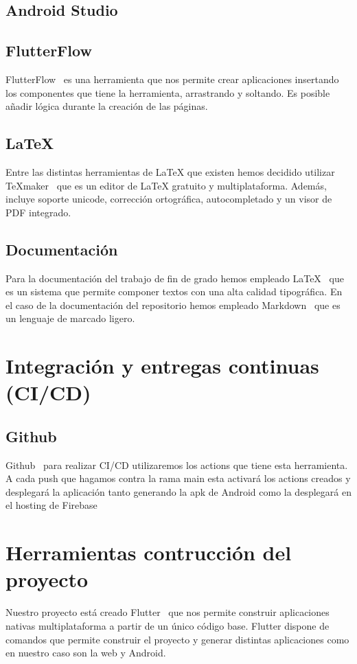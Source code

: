 \subsection{Android Studio}

\subsection{FlutterFlow}
FlutterFlow~\cite{flutterflow} es una herramienta que nos permite crear aplicaciones insertando los componentes que tiene la herramienta, arrastrando y soltando. Es posible añadir lógica durante la creación de las páginas.

\subsection{LaTeX}
Entre las distintas herramientas de \LaTeX{} que existen hemos decidido utilizar TeXmaker~\cite{wiki:texmaker, texmaker} que es un editor de \LaTeX{} gratuito y multiplataforma. Además, incluye soporte unicode, corrección ortográfica, autocompletado y un visor de PDF integrado.

\subsection{Documentación}
Para la documentación del trabajo de fin de grado hemos empleado \LaTeX{}~\cite{wiki:latex} que es un sistema que permite componer textos con una alta calidad tipográfica. En el caso de la documentación del repositorio hemos empleado Markdown~\cite{wiki:markdown} que es un lenguaje de marcado ligero.

\section{Integración y entregas continuas (CI/CD)}
\subsection{Github}
Github~\cite{github} para realizar CI/CD utilizaremos los actions que tiene esta herramienta. A cada push que hagamos contra la rama main esta activará los actions creados y desplegará la aplicación tanto generando la apk de Android como la desplegará en el hosting de Firebase

\section{Herramientas contrucción del proyecto}
Nuestro proyecto está creado Flutter~\cite{flutter} que nos permite construir aplicaciones nativas multiplataforma a partir de un único código base. Flutter dispone de comandos que permite construir el proyecto y generar distintas aplicaciones como en nuestro caso son la web y Android.

